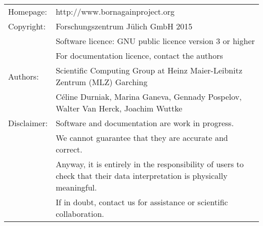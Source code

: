 

\newpage
\thispagestyle{empty}

\vfill

\noindent
\begin{tabular}{@{}p{7em}@{}l@{}}
Homepage:&   http://www.bornagainproject.org\\[2ex]
Copyright:&  Forschungszentrum Jülich GmbH 2015\\
            &Software licence: GNU public licence version 3 or higher\\
            &For documentation licence, contact the authors\\[2ex]
Authors:    &Scientific Computing Group at Heinz Maier-Leibnitz Zentrum (MLZ) Garching\\
            &Céline Durniak, Marina Ganeva, Gennady Pospelov,
             Walter Van Herck, Joachim Wuttke\\[2ex]
Disclaimer: &Software and documentation are work in progress.\\
            &We cannot guarantee that they are accurate and correct.\\
            &Anyway, it is entirely in the responsibility of users
             to check that their data interpretation is physically meaningful.\\
            &If in doubt, contact us for assistance or scientific collaboration.
\end{tabular}
